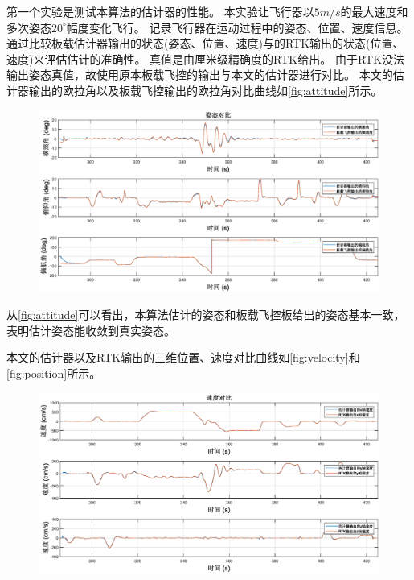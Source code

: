 \documentclass[
  type=master
]{gdutthesis}
\begin{document}
第一个实验是测试本算法的估计器的性能。
本实验让飞行器以$5m/s$的最大速度和多次姿态$20^{\circ}$幅度变化飞行。
记录飞行器在运动过程中的姿态、位置、速度信息。
通过比较板载估计器输出的状态(姿态、位置、速度)与的RTK输出的状态(位置、速度)来评估估计的准确性。
真值是由厘米级精确度的RTK给出。
由于RTK没法输出姿态真值，故使用原本板载飞控的输出与本文的估计器进行对比。
本文的估计器输出的欧拉角以及板载飞控输出的欧拉角对比曲线如\autoref{fig:attitude}所示。
\begin{figure}[H]
	\centering
	\includegraphics[width=1.0\textwidth]{attitude4.eps}
	\label{fig:attitude}
\end{figure} 
从\autoref{fig:attitude}可以看出，本算法估计的姿态和板载飞控板给出的姿态基本一致，表明估计姿态能收敛到真实姿态。

本文的估计器以及RTK输出的三维位置、速度对比曲线如\autoref{fig:velocity}和\autoref{fig:position}所示。
\begin{figure}[H]
	\centering
	\includegraphics[width=1.0\textwidth]{velocity3.eps}
	\label{fig:velocity}
\end{figure}
\end{document}
